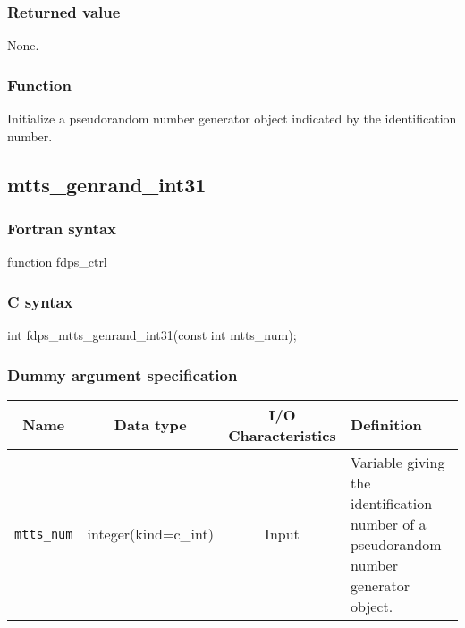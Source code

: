 \subsubsection*{Returned value}
None.

\subsubsection*{Function}
Initialize a pseudorandom number generator object indicated by the identification number.
\clearpage

\subsection{mtts\_genrand\_int31}
\subsubsection*{Fortran syntax}
\begin{screen}
\begin{spverbatim}  
function fdps_ctrl%
\end{spverbatim}
\end{screen}

\subsubsection*{C syntax}
\begin{screen}
\begin{spverbatim}  
int fdps_mtts_genrand_int31(const int mtts_num);
\end{spverbatim}
\end{screen}

\subsubsection*{Dummy argument specification}
\begin{table}[h]
\begin{tabularx}{\linewidth}{cccX}
\toprule
\rowcolor{Snow2}
Name & Data type & I/O Characteristics & Definition \\
\midrule
\verb|mtts_num| & integer(kind=c\_int) & Input & Variable giving the identification number of a pseudorandom number generator object.\\
\bottomrule
\end{tabularx}
\end{table}

